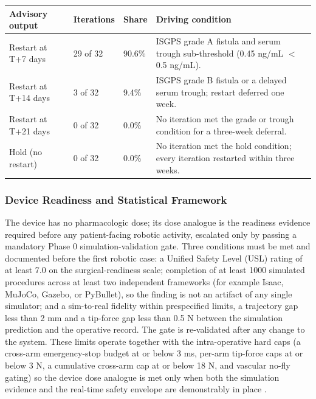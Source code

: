 \noindent\begin{tabularx}{\textwidth}{L{3.2cm} C{2.0cm} C{2.4cm} Y}
\toprule
\textbf{Advisory output} & \textbf{Iterations} & \textbf{Share} & \textbf{Driving condition} \\
\midrule
Restart at T+7 days & 29 of 32 & 90.6\% & ISGPS grade A fistula and serum trough sub-threshold (0.45 ng/mL $<$ 0.5 ng/mL). \\
\addlinespace
Restart at T+14 days & 3 of 32 & 9.4\% & ISGPS grade B fistula or a delayed serum trough; restart deferred one week. \\
\addlinespace
Restart at T+21 days & 0 of 32 & 0.0\% & No iteration met the grade or trough condition for a three-week deferral. \\
\addlinespace
Hold (no restart) & 0 of 32 & 0.0\% & No iteration met the hold condition; every iteration restarted within three weeks. \\
\bottomrule
\end{tabularx}
\vspace*{-0.35cm}

\subsubsection{Device Readiness and Statistical Framework}

The device has no pharmacologic dose; its dose analogue is the readiness evidence
required before any patient-facing robotic activity, escalated only by passing a
mandatory Phase 0 simulation-validation gate. Three conditions must be met and
documented before the first robotic case: a Unified Safety Level (USL) rating of at
least 7.0 on the surgical-readiness scale; completion of at least 1000 simulated
procedures across at least two independent frameworks (for example Isaac, MuJoCo,
Gazebo, or PyBullet), so the finding is not an artifact of any single simulator; and
a sim-to-real fidelity within prespecified limits, a trajectory gap less than 2 mm
and a tip-force gap less than 0.5 N between the simulation prediction and the
operative record. The gate is re-validated after any change to the system. These
limits operate together with the intra-operative hard caps (a cross-arm
emergency-stop budget at or below 3 ms, per-arm tip-force caps at or below 3 N, a
cumulative cross-arm cap at or below 18 N, and vascular no-fly gating) so the device
dose analogue is met only when both the simulation evidence and the real-time safety
envelope are demonstrably in place \cite{onpremwhippl,daraxwhipple}.

